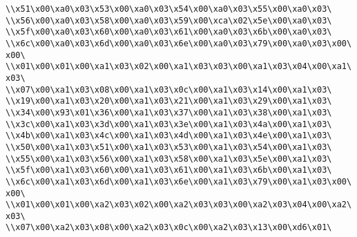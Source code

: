 \verb|\\x51\x00\xa0\x03\x53\x00\xa0\x03\x54\x00\xa0\x03\x55\x00\xa0\x03\|\newline
\verb|\\x56\x00\xa0\x03\x58\x00\xa0\x03\x59\x00\xca\x02\x5e\x00\xa0\x03\|\newline
\verb|\\x5f\x00\xa0\x03\x60\x00\xa0\x03\x61\x00\xa0\x03\x6b\x00\xa0\x03\|\newline
\verb|\\x6c\x00\xa0\x03\x6d\x00\xa0\x03\x6e\x00\xa0\x03\x79\x00\xa0\x03\x00\x00\|\newline
\verb|\\x01\x00\x01\x00\xa1\x03\x02\x00\xa1\x03\x03\x00\xa1\x03\x04\x00\xa1\x03\|\newline
\verb|\\x07\x00\xa1\x03\x08\x00\xa1\x03\x0c\x00\xa1\x03\x14\x00\xa1\x03\|\newline
\verb|\\x19\x00\xa1\x03\x20\x00\xa1\x03\x21\x00\xa1\x03\x29\x00\xa1\x03\|\newline
\verb|\\x34\x00\x93\x01\x36\x00\xa1\x03\x37\x00\xa1\x03\x38\x00\xa1\x03\|\newline
\verb|\\x3c\x00\xa1\x03\x3d\x00\xa1\x03\x3e\x00\xa1\x03\x4a\x00\xa1\x03\|\newline
\verb|\\x4b\x00\xa1\x03\x4c\x00\xa1\x03\x4d\x00\xa1\x03\x4e\x00\xa1\x03\|\newline
\verb|\\x50\x00\xa1\x03\x51\x00\xa1\x03\x53\x00\xa1\x03\x54\x00\xa1\x03\|\newline
\verb|\\x55\x00\xa1\x03\x56\x00\xa1\x03\x58\x00\xa1\x03\x5e\x00\xa1\x03\|\newline
\verb|\\x5f\x00\xa1\x03\x60\x00\xa1\x03\x61\x00\xa1\x03\x6b\x00\xa1\x03\|\newline
\verb|\\x6c\x00\xa1\x03\x6d\x00\xa1\x03\x6e\x00\xa1\x03\x79\x00\xa1\x03\x00\x00\|\newline
\verb|\\x01\x00\x01\x00\xa2\x03\x02\x00\xa2\x03\x03\x00\xa2\x03\x04\x00\xa2\x03\|\newline
\verb|\\x07\x00\xa2\x03\x08\x00\xa2\x03\x0c\x00\xa2\x03\x13\x00\xd6\x01\|\newline

